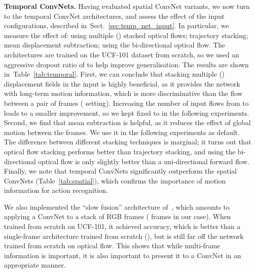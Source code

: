 \documentclass{article} \usepackage{nips14submit_e,times}
\newcommand{\tblref}[1]{Table~\ref{#1}}
\newcommand{\sref}[1]{Sect.~\ref{#1}}
\begin{document}
\noindent\textbf{Temporal ConvNets.}
Having evaluated spatial ConvNet variants, we now turn to the temporal ConvNet architectures, and assess the effect of the input configurations, described in~\sref{sec:temp_net_input}.
In particular, we measure the effect of: using multiple () stacked optical flows; trajectory stacking; mean displacement subtraction; using the bi-directional optical flow.
The architectures are trained on the UCF-101 dataset from scratch, so we used an aggressive dropout ratio of  to help improve generalisation. 
The results are shown in~\tblref{tab:temporal}.
First, we can conclude that stacking multiple () displacement fields in the input is highly beneficial, as it provides the network with long-term motion information, which is more discriminative 
than the flow between a pair of frames ( setting). Increasing the number of input flows from  to  leads to a smaller improvement, so we kept  fixed to  in the following experiments.
Second, we find that mean subtraction is helpful, as it reduces the effect of global motion between the frames. We use it in the following experiments as default.
The difference between different stacking techniques is marginal; it turns out that optical flow stacking performs better than trajectory stacking,
and using the bi-directional optical flow is only slightly better than a uni-directional forward flow.
Finally, we note that temporal ConvNets significantly outperform the spatial ConvNets (\tblref{tab:spatial}), which confirms the importance of motion information for action recognition.

We also implemented the ``slow fusion'' architecture of~\cite{Karpathy14}, which amounts to applying a \mbox{ConvNet} to a stack of RGB frames ( frames in our case).
When trained from scratch on UCF-101, it achieved  accuracy, which is better than a single-frame architecture trained from scratch (), but is still far off the network 
trained from scratch on optical flow. This shows that while multi-frame information is important, it is also important to present it to a ConvNet in an appropriate manner.
\end{document}
